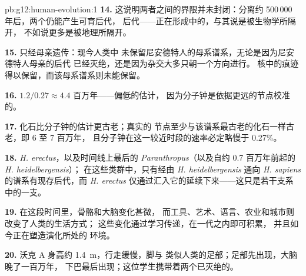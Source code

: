 \begin{solution}{pb:g12:human-evolution:1}
\textbf{14.} 这说明两者之间的界限并未封闭：分离约 500\,000
年后，两个仍能产生可育后代，
后代——正在形成中的，与其说是被生物学所隔开，
不如说更多是被地理所隔开。

\textbf{15.} 只经母亲遗传：现今人类中
未保留尼安德特人的母系谱系，无论是因为尼安德特人母亲的后代
已经灭绝，还是因为杂交大多只朝一个方向进行。
核中的痕迹得以保留，而该母系谱系则未能保留。

\textbf{16.} $1.2/0.27 \approx 4.4$ 百万年——偏低的估计，
因为分子钟是依据更远的节点校准的。

\textbf{17.} 化石比分子钟的估计更古老；真实的
节点至少与该谱系最古老的化石一样古老，即 6 至 7 百万年，
且分子钟在这一较近时段的速率必定略慢于
0.27\%。

\textbf{18.} \emph{H. erectus}，以及时间线上最后的
\emph{Paranthropus}（以及自约 0.7 百万年前起的 \emph{H. heidelbergensis}）；
在这些类群中，只有经由 \emph{H. heidelbergensis}
通向 \emph{H. sapiens} 的谱系有现存后代，而 \emph{H. erectus}
仅通过汇入它的延续下来——这只是若干支系中的一支。

\textbf{19.} 在这段时间里，骨骼和大脑变化甚微，
而工具、艺术、语言、农业和城市则改变了人类的生活方式；
这些变化通过学习传递，在一代之内即可积累，
并且如今正在塑造演化所处的
环境。

\textbf{20.} 沃克 A 身高约 \qty{1.4}{m}，行走缓慢，脚与
类似人类的足部；足部先出现，大脑晚了一百万年，
下巴最后出现；这位学生携带着两个已灭绝的。
\end{solution}
